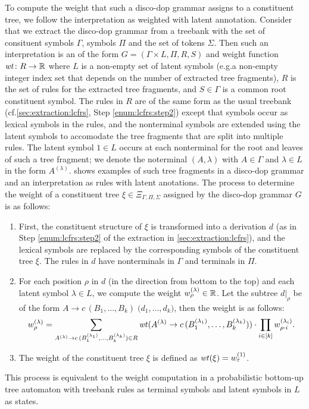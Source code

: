 \documentclass[../../document.tex]{subfiles}
\begin{document}
    To compute the weight that such a disco-dop grammar assigns to a constituent tree, we follow the interpretation as weighted  with latent annotation.
    Consider that we extract the disco-dop grammar from a treebank with the set of consituent symbols \(\varGamma\),  symbols \(\varPi\) and the set of tokens \(\varSigma\).
    Then such an interpretation is an  of the form \(G = (\varGamma \times L, \varPi, R, S)\) and weight function \(\mathit{wt}\colon R \to \mathbb{R}\)  where \(L\) is a non-empty set of latent symbols (e.g.\@ a non-empty integer index set that depends on the number of extracted tree fragments), \(R\) is the set of rules for the extracted tree fragments, and \(S \in \varGamma\) is a common root constituent symbol.
    The rules in \(R\) are of the same form as the usual treebank  (cf.\@ \cref{sec:extraction:lcfrs}, Step \ref{enum:lcfrs:step2}) except that  symbols occur as lexical symbols in the rules, and the nonterminal symbols are extended using the latent symbols to accomodate the tree fragments that are split into multiple rules.
    The latent symbol \(1 \in L\) occurs at each nonterminal for the root and leaves of such a tree fragment; we denote the noterminal \((A, \lambda)\) with \(A\in \varGamma\) and \(\lambda \in L\) in the form \(A^{(\lambda)}\).
     shows examples of such tree fragments in a disco-dop grammar and an interpretation as  rules with latent anotations.
    The process to determine the weight of a constituent tree \(\xi \in \Xi_{\varGamma, \varPi, \varSigma}\) assigned by the disco-dop grammar \(G\) is as follows:
    \begin{enumerate}
        \item First, the constituent structure of \(\xi\) is transformed into a  derivation \(d\) (as in Step \ref{enum:lcfrs:step2} of the extraction in \cref{sec:extraction:lcfrs}), and the lexical symbols are replaced by the corresponding  symbols of the constituent tree \(\xi\). The rules in \(d\) have nonterminals in \(\varGamma\) and terminals in \(\varPi\).
        \item For each position \(\rho\) in \(d\) (in the direction from bottom to the top) and each latent symbol \(\lambda \in L\), we compute the weight \(w_\rho^{(\lambda)} \in \mathbb{R}\). Let the subtree \(d|_\rho\) be of the form \(A \to c\,(B_1, \ldots, B_k)\;\big(d_1, \ldots, d_k)\), then the weight is as follows:
            \[
                w_\rho^{(\lambda)} = \sum_{A^{(\lambda)} \to c\,(B_1^{(\lambda_1)}, \ldots, B_k^{(\lambda_k)}) \in R} \mathit{wt}(A^{(\lambda)} \to c\,(B_1^{(\lambda_1)}, \ldots, B_k^{(\lambda_k)})) \cdot \prod_{i \in [k]} w_{\rho\cdot i}^{(\lambda_i)} \text{.}
            \]
        \item The weight of the constituent tree \(\xi\) is defined as \(\mathit{wt}(\xi) = w_\varepsilon^{(1)}\).
    \end{enumerate}
    This process is equivalent to the weight computation in a probabilistic bottom-up tree automaton with treebank  rules as terminal symbols and latent symbols in \(L\) as states.
    
\end{document}
